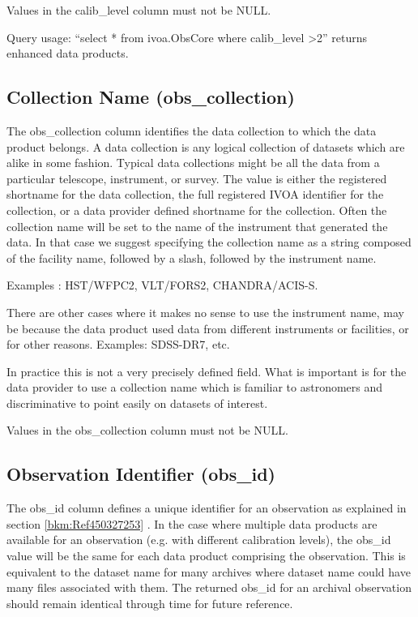 \documentclass[11pt,a4paper]{ivoa}
\begin{document}
Values in the calib\_level column must not be NULL.

Query usage: ``select * from ivoa.ObsCore where calib\_level {\textgreater}2'' returns enhanced data products.

\subsection{Collection Name (obs\_collection)}
The obs\_collection column identifies the data collection to which the data product belongs.  A data collection is any
logical collection of datasets which are alike in some fashion.  Typical data collections might be all the data from a
particular telescope, instrument, or survey. The value is either the registered shortname for the data collection, the
full registered IVOA identifier for the collection, or a data provider defined shortname for the collection.  Often the
collection name will be set to the name of the instrument that generated the data.  In that case we suggest specifying
the collection name as a string composed of the facility name, followed by a slash, followed by the instrument name.

Examples : HST/WFPC2, VLT/FORS2, CHANDRA/ACIS-S.

There are other cases where it makes no sense to use the instrument name, may be because the data product used data from
different instruments or facilities, or for other reasons.  Examples: SDSS-DR7, etc.

In practice this is not a very precisely defined field.  What is important is for the data provider to use a collection
name which is familiar to astronomers and discriminative to point easily on datasets of interest.

Values in the obs\_collection column must not be NULL.

\subsection{Observation Identifier (obs\_id)}
The obs\_id column defines a unique identifier for an observation as explained in section \ref{bkm:Ref450327253} . In
the case where multiple data products are available for an observation (e.g. with different calibration levels), the
obs\_id value will be the same for each data product comprising the observation. This is equivalent to the dataset name
for many archives where dataset name could have many files associated with them. The returned obs\_id for an archival
observation should remain identical through time for future reference.
\end{document}
